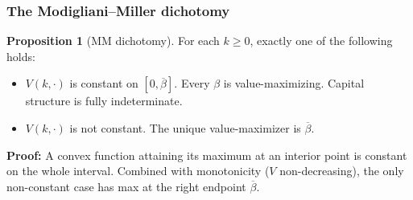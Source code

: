 \documentclass[blue]{beamer}
\def\geq{\geqslant}
\theoremstyle{definition}
\theoremstyle{example}
\newtheorem*{proposition}{Proposition}
\begin{document}
\begin{frame}\frametitle{The Modigliani--Miller dichotomy}
\begin{proposition}[MM dichotomy]
For each $k \geq 0$, exactly one of the following holds:
\bigskip

\begin{itemize}
\item[\textup{(MM)}] $V(k, \cdot)$ is constant on $[0, \overline{\beta}]$. Every $\beta$ is value-maximizing. Capital structure is fully indeterminate.
\bigskip

\item[\textup{($\neg$MM)}] $V(k, \cdot)$ is not constant. The unique value-maximizer is $\overline{\beta}$.
\end{itemize}
\end{proposition}
\bigskip

\textbf{Proof:} A convex function attaining its maximum at an interior point is constant on the whole interval. Combined with monotonicity ($V$ non-decreasing), the only non-constant case has max at the right endpoint $\overline{\beta}$.
\end{frame}
\end{document}
